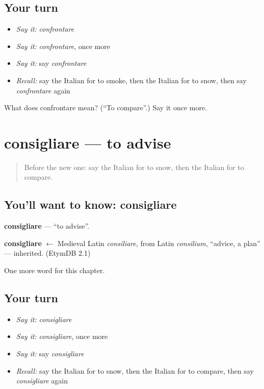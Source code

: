 \subsection*{Your turn}
\begin{itemize}
\raggedright
  \item \emph{Say it:} \emph{confrontare}
  \item \emph{Say it:} \emph{confrontare}, once more
  \item \emph{Say it:} say \emph{confrontare}
  \item \emph{Recall:} say the Italian for to smoke, then the Italian for to snow, then say \emph{confrontare} again
\end{itemize}

\begin{tcolorbox}[breakable,colback=teal!4,colframe=teal!35!black,title={Before you move on}]
What does confrontare mean? (\textquotedblleft{}To compare\textquotedblright{}.) Say it once more.
\end{tcolorbox}
\section[consigliare]{consigliare — to advise}

\label{lesson:IT-C145-consigliare}



\begin{quote}
Before the new one: say the Italian for to snow, then the Italian for to compare.
\end{quote}

\subsection*{You'll want to know: consigliare}
\textbf{consigliare} — \textquotedblleft{}to advise\textquotedblright{}.

\begin{cousinweb}
\textbf{consigliare} $\leftarrow$ Medieval Latin \emph{consiliare}, from Latin \emph{consilium}, \textquotedblleft{}advice, a plan\textquotedblright{} — inherited. (EtymDB 2.1)
\end{cousinweb}

\begin{grammarlens}[title={What you've built}]
One more word for this chapter.
\end{grammarlens}

\subsection*{Your turn}
\begin{itemize}
\raggedright
  \item \emph{Say it:} \emph{consigliare}
  \item \emph{Say it:} \emph{consigliare}, once more
  \item \emph{Say it:} say \emph{consigliare}
  \item \emph{Recall:} say the Italian for to snow, then the Italian for to compare, then say \emph{consigliare} again
\end{itemize}

